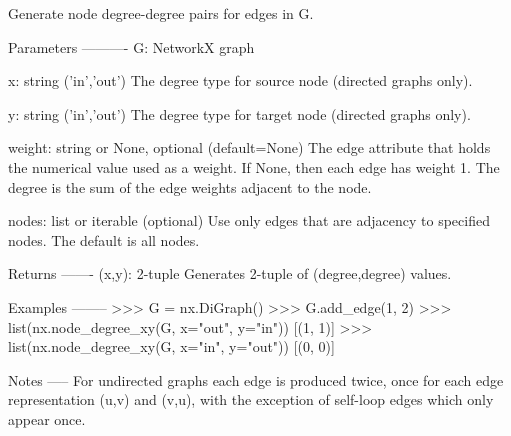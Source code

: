 \begin{DoxyVerb}Generate node degree-degree pairs for edges in G.

Parameters
----------
G: NetworkX graph

x: string ('in','out')
   The degree type for source node (directed graphs only).

y: string ('in','out')
   The degree type for target node (directed graphs only).

weight: string or None, optional (default=None)
   The edge attribute that holds the numerical value used
   as a weight.  If None, then each edge has weight 1.
   The degree is the sum of the edge weights adjacent to the node.

nodes: list or iterable (optional)
    Use only edges that are adjacency to specified nodes.
    The default is all nodes.

Returns
-------
(x,y): 2-tuple
    Generates 2-tuple of (degree,degree) values.


Examples
--------
>>> G = nx.DiGraph()
>>> G.add_edge(1, 2)
>>> list(nx.node_degree_xy(G, x="out", y="in"))
[(1, 1)]
>>> list(nx.node_degree_xy(G, x="in", y="out"))
[(0, 0)]

Notes
-----
For undirected graphs each edge is produced twice, once for each edge
representation (u,v) and (v,u), with the exception of self-loop edges
which only appear once.
\end{DoxyVerb}
 